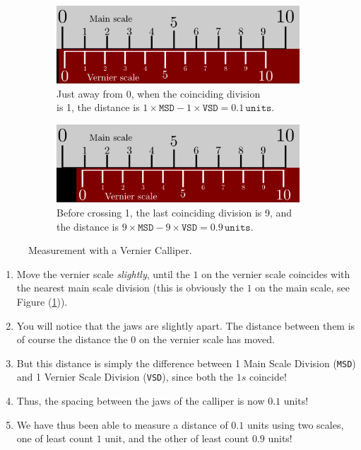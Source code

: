 \begin{figure}[!htb]
        \begin{subfigure}[b]{0.5\textwidth}
                \includegraphics[width=0.95\linewidth]{figs/vernier2.png}
                \caption{Just away from 0, when the coinciding division \\is 1, the distance is $1\times\texttt{MSD}-1\times\texttt{VSD}=0.1\, \texttt{units}$.}
                \label{fig:vernier_2}
        \end{subfigure}\hfill
        \begin{subfigure}[b]{0.5\textwidth}
                \includegraphics[width=0.95\linewidth]{figs/vernier3.png}
                \caption{Before crossing 1, the last coinciding division is 9, and the distance is $9\times\texttt{MSD}-9\times\texttt{VSD}=0.9\, \texttt{units}$.}
                \label{fig:vernier_3}
        \end{subfigure}%
        \caption{Measurement with a Vernier Calliper.}
        \label{fig:verniermeasurements}
\end{figure}

\begin{enumerate}
    \item Move the vernier scale \textit{slightly}, until the $1$ on the vernier scale coincides with the nearest main scale division (this is obviously the $1$ on the main scale, see Figure (\ref{fig:vernier_2})).
    
    \item You will notice that the jaws are slightly apart. The distance between them is of course the distance the $0$ on the vernier scale has moved.
    
    \item But this distance is simply the difference between 1 Main Scale Division (\texttt{MSD}) and 1 Vernier Scale Division (\texttt{VSD}), since both the $1s$ coincide!
    
    \item Thus, the spacing between the jaws of the calliper is now $0.1$ units!
    
    \item We have thus been able to measure a distance of $0.1$ units using two scales, one of least count $1$ unit, and the other of least count $0.9$ units!
\end{enumerate}

